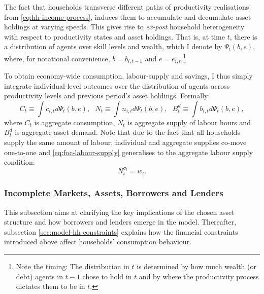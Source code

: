 \documentclass[a4paper,12pt]{article} %
\numberwithin{equation}{section} %
\numberwithin{figure}{section}
\numberwithin{table}{section}
\begin{document}
The fact that households transverse different paths of productivity realisations from \eqref{eq:hh-income-process}, induces them to accumulate and decumulate asset holdings at varying speeds. This gives rise to \textit{ex-post} household heterogeneity with respect to productivity states and asset holdings. That is, at time $t$, there is a distribution of agents over skill levels and wealth, which I denote by $\Psi_t (b,e)$, where, for notational convenience, $b=b_{i,t-1}$ and $e=e_{i,t}$.\footnote{Note the timing: The distribution in $t$ is determined by how much wealth (or debt) agents in $t-1$ chose to hold in $t$ and by where the productivity process dictates them to be in $t$.}


To obtain economy-wide consumption, labour-supply and savings, I thus simply integrate individual-level outcomes over the distribution of agents across productivity levels and previous period's asset holdings. Formally:
\begin{equation*}
    C_t \equiv \int c_{i,t} d \Psi_t (b,e), \ \ \ N_t \equiv \int n_{i,t} d \Psi_t (b,e), \ \ \ B_t^d \equiv \int b_{i,t} d \Psi_t (b,e), %
\end{equation*}
where $C_t$ is aggregate consumption, $N_t$ is aggregate supply of labour hours and $B_t^d$ is aggregate asset demand. Note that due to the fact that all households supply the same amount of labour, individual and aggregate supplies co-move one-to-one and \eqref{eq:foc-labour-supply} generalises to the aggregate labour supply condition:
\begin{equation}
    N_t^{\sigma_l} = w_t. \label{eq:hh-agg-labour-supply}
\end{equation}


\subsubsection{Incomplete Markets, Assets, Borrowers and Lenders}
\label{sec:model-hh-assets}

This subsection aims at clarifying the key implications of the chosen asset structure and how borrowers and lenders emerge in the model. Thereafter, subsection \ref{sec:model-hh-constraints} explains how the financial constraints introduced above affect households' consumption behaviour.  
\end{document}
